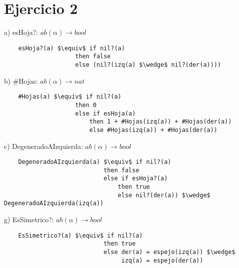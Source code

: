 \section{Ejercicio 2}

a) esHoja?: $ab(\alpha) \rightarrow bool$
\begin{lstlisting}
    esHoja?(a) $\equiv$ if nil?(a)
                    then false
                    else (nil?(izq(a) $\wedge$ nil?(der(a))))
\end{lstlisting}

b) \#Hojas: $ab(\alpha) \rightarrow nat$
\begin{lstlisting}
    #Hojas(a) $\equiv$ if nil?(a)
                    then 0
                    else if esHoja(a)
                        then 1 + #Hojas(izq(a)) + #Hojas(der(a))
                        else #Hojas(izq(a)) + #Hojas(der(a))
\end{lstlisting}

c) DegeneradoAIzquierda: $ab(\alpha) \rightarrow bool$
\begin{lstlisting}
    DegeneradoAIzquierda(a) $\equiv$ if nil?(a)
                            then false
                            else if esHoja?(a)
                                then true
                                else nil?(der(a)) $\wedge$ DegeneradoAIzquierda(izq(a))
\end{lstlisting}

g) EsSimetrico?: $ab(\alpha) \rightarrow bool$
\begin{lstlisting}
    EsSimetrico?(a) $\equiv$ if nil?(a)
                            then true
                            else der(a) = espejo(izq(a)) $\wedge$
                                 izq(a) = espejo(der(a))    
\end{lstlisting}
